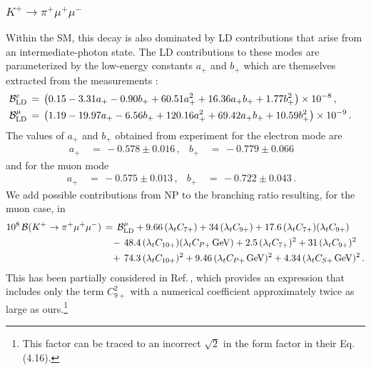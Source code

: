 \documentclass[amsmath,amssymb,aps,nofootinbib,prd,preprint,superscriptaddress,tightenlines,a4paper,bm]{revtex4-2}
\begin{document}
\subsubsection{\boldmath$K^+\to\pi^+\mu^+\mu^-$}   \vspace{-1em}

Within the SM, this decay is also dominated by LD contributions that arise from an intermediate-photon state.
The LD contributions to these modes are parameterized by the low-energy constants $a_+$ and $b_+$ which are themselves extracted from the measurements \cite{Cirigliano:2011ny}:
\begin{align}
    {\cal B}_{\rm LD}^e & \,=\, \big(0.15-3.31a_+-0.90b_++60.51a_+^2+16.36a_+b_++1.77b_+^2\big) \times 10^{-8} \,, \nonumber \\
    {\cal B}_{\rm LD}^\mu & \,=\, \big(1.19-19.97a_+-6.56b_++120.16a_+^2+69.42a_+b_++10.59b_+^2\big) \times 10^{-9} \,. &
\end{align}
The values of $a_+$ and $b_+$  obtained from experiment for the electron mode \cite{NA482:2009pfe} are
\begin{align}
    a_+ & \,=\, -0.578\pm0.016 \,, & b_+ & \,=\, -0.779\pm0.066 &
    \label{abmuon}
\end{align}
and for the muon mode  \cite{NA62:2022qes}
\begin{align}
    a_+ & \,=\, -0.575\pm0.013 \,, & b_+ & \,=\, -0.722\pm0.043 \,. &
    \label{abelectron}
\end{align}
We add possible contributions from NP to the branching ratio resulting, for the muon case, in
\begin{align}
10^8\, {\cal B}(K^+\to\pi^+\mu^+\mu^-)
 & \,=\, {\cal B}_{\rm LD}^\mu + 9.66\, (\lambda_t C_{7+}) + 34\, (\lambda_t C_{9+})+ 17.6\, (\lambda_t C_{7+}) (\lambda_t C_{9+}) \nonumber \\ & ~~~ -\, 48.4\, (\lambda_t C_{10+}) (\lambda_t C_{P+\,}{\rm GeV})
+ 2.5\, (\lambda_t C_{7+})^2 + 31\, (\lambda_t C_{9+})^2 \nonumber \\ & ~~~ +\, 74.3\, (\lambda_t C_{10+})^2 + 9.46\, (\lambda_t C_{P+\,}{\rm GeV})^2 + 4.34\, (\lambda_t C_{S+\,}{\rm GeV})^2 \,.
\label{ktopimm}
\end{align}
This has been partially considered in Ref.\,\cite{Geng:2021fog}, which provides an expression that includes only the term $C_{9+}^2$ with a numerical coefficient approximately twice as large as ours.\footnote{This factor can be traced to an incorrect $\sqrt{2}$ in the form factor in their Eq. (4.16).\medskip}
\end{document}
